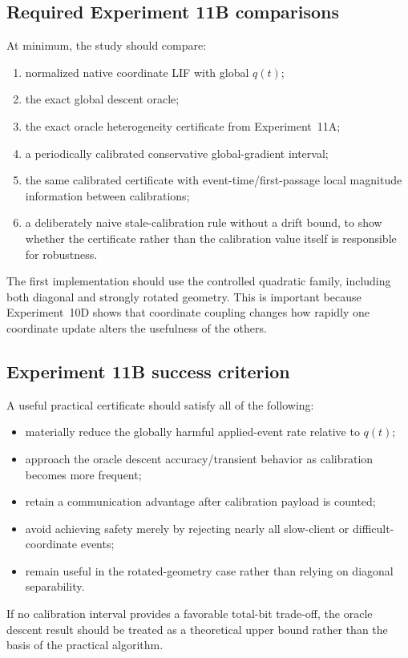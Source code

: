 \subsection{Required Experiment 11B comparisons}

At minimum, the study should compare:
\begin{enumerate}
  \item normalized native coordinate LIF with global $q(t)$;
  \item the exact global descent oracle;
  \item the exact oracle heterogeneity certificate from Experiment~11A;
  \item a periodically calibrated conservative global-gradient interval;
  \item the same calibrated certificate with event-time/first-passage local magnitude information between calibrations;
  \item a deliberately naive stale-calibration rule without a drift bound, to show whether the certificate rather than the calibration value itself is responsible for robustness.
\end{enumerate}
The first implementation should use the controlled quadratic family, including both diagonal and strongly rotated geometry. This is important because Experiment~10D shows that coordinate coupling changes how rapidly one coordinate update alters the usefulness of the others.

\subsection{Experiment 11B success criterion}

A useful practical certificate should satisfy all of the following:
\begin{itemize}
  \item materially reduce the globally harmful applied-event rate relative to $q(t)$;
  \item approach the oracle descent accuracy/transient behavior as calibration becomes more frequent;
  \item retain a communication advantage after calibration payload is counted;
  \item avoid achieving safety merely by rejecting nearly all slow-client or difficult-coordinate events;
  \item remain useful in the rotated-geometry case rather than relying on diagonal separability.
\end{itemize}
If no calibration interval provides a favorable total-bit trade-off, the oracle descent result should be treated as a theoretical upper bound rather than the basis of the practical algorithm.

